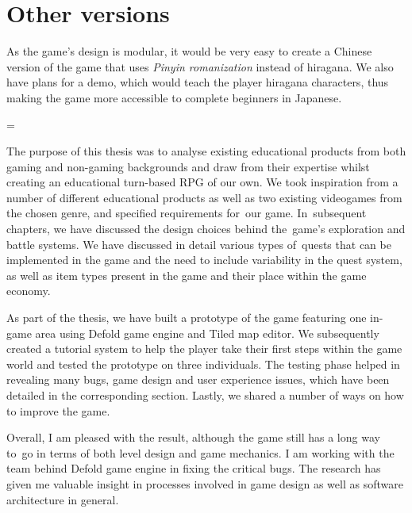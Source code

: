 \documentclass[thesis=B,english,hidelinks]{FITthesisXE}[2012/06/26]
\begin{document}
\section{Other versions}

As the game's design is modular, it would be very easy to create a Chinese version of the game that uses \emph{Pinyin romanization} instead of hiragana. We also have plans for a demo, which would teach the player hiragana characters, thus making the game more accessible to complete beginners in Japanese.

\begin{conclusion}

\emergencystretch=\maxdimen
{}

The purpose of this thesis was to analyse existing educational products from both gaming and non-gaming backgrounds and draw from their expertise whilst creating an educational turn-based RPG of our own. We took inspiration from a number of different educational products as well as two existing videogames from the chosen genre, and specified requirements for~our game. In~subsequent chapters, we have discussed the design choices behind the~game's exploration and battle systems. We have discussed in detail various types of~quests that can be implemented in the game and the need to include variability in the quest system, as well as item types present in the game and their place within the game economy.

As part of the thesis, we have built a prototype of the game featuring one in-game area using Defold game engine and Tiled map editor. We subsequently created a tutorial system to help the player take their first steps within the game world and tested the prototype on three individuals. The testing phase helped in revealing many bugs, game design and user experience issues, which have been detailed in the corresponding section. Lastly, we shared a number of ways on how to improve the game.

Overall, I am pleased with the result, although the game still has a long way to~go in terms of both level design and game mechanics. I am working with the team behind Defold game engine in fixing the critical bugs. The research has given me valuable insight in processes involved in game design as well as software architecture in general.

\end{conclusion}

\printbibliography[title={Sources}]
\end{document}
